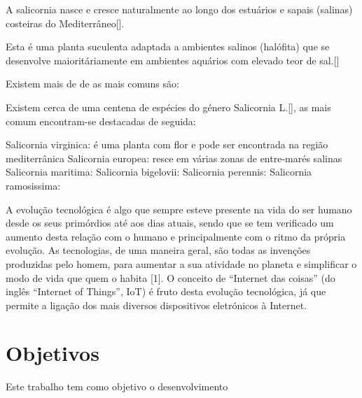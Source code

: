 A salicornia nasce e cresce naturalmente ao longo dos estuários e sapais (salinas) costeiras do Mediterrâneo[]. 





Esta é uma planta suculenta adaptada a ambientes salinos (halófita) que se desenvolve maioritáriamente em ambientes aquários com elevado teor de sal.[] 






Existem mais de  de  as mais comuns são: 






Existem cerca de uma centena de espécies do género Salicornia L.[], as mais comum encontram-se destacadas de seguida: 

Salicornia virginica: é uma planta com flor e pode ser encontrada na região mediterrânica
Salicornia europea: resce em várias zonas de entre-marés salinas 
Salicornia maritima: 
Salicornia bigelovii: 
Salicornia perennis: 
Salicornia ramosissima: 






A evolução tecnológica é algo que sempre esteve presente na vida do ser humano desde os seus primórdios até aos dias atuais, sendo que se tem verificado um aumento desta relação com o humano e principalmente com o ritmo da própria evolução.  As tecnologias, de uma maneira geral, são todas as invenções produzidas pelo homem, para aumentar a sua atividade no planeta e simplificar o modo de vida que quem o habita [1]. O conceito de “Internet das coisas” (do inglês “Internet of Things”, IoT) é fruto desta evolução tecnológica, já que permite a ligação dos mais diversos dispositivos eletrónicos à Internet. 









\section{Objetivos}

Este trabalho tem como objetivo o desenvolvimento

